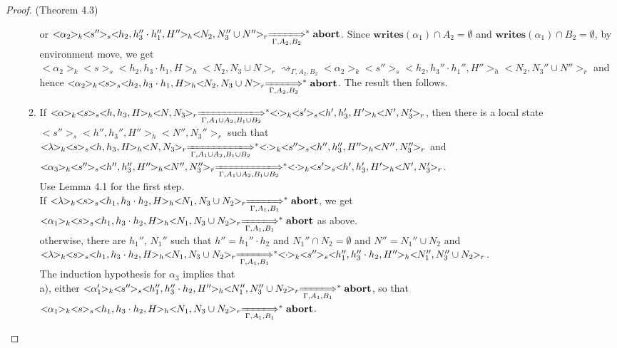 \documentclass{lmcs} %
\theoremstyle{plain}\newtheorem{satz}[thm]{Satz} %
\begin{document}
\begin{proof}{(Theorem 4.3)}
\begin{itemize}
\begin{enumerate}
            or $<\!\!\alpha_2\!\!>_k<\!\!s''\!\!>_s<\!\!h_2,h_3''\cdot h_1'',H''\!\!>_h<\!\!N_2,N_3''\cup N''\!\!>_r\xLongrightarrow[\Gamma, A_2,B_2]{}^*\mathbf{abort}$. Since $\mathbf{writes}(\alpha_1)\cap A_2 =\emptyset$ and $\mathbf{writes}(\alpha_1)\cap B_2 =\emptyset$, by environment move, we get $<\!\!\alpha_2\!\!>_k<\!\!s\!\!>_s<\!\!h_2,h_3\cdot h_1,H\!\!>_h<\!\!N_2,N_3\cup N\!\!>_r\rightsquigarrow_{\Gamma, A_2, B_2}<\!\!\alpha_2\!\!>_k<\!\!s''\!\!>_s<\!\!h_2,h_3''\cdot h_1'',H''\!\!>_h<\!\!N_2,N_3''\cup N''\!\!>_r$ and hence $<\!\!\alpha_2\!\!>_k<\!\!s\!\!>_s<\!\!h_2,h_3\cdot h_1,H\!\!>_h<\!\!N_2,N_3\cup N\!\!>_r\xLongrightarrow[\Gamma, A_2,B_2]{}^*\mathbf{abort}$. The result then follows.
      \item If $<\!\!\alpha\!\!>_k<\!\!s\!\!>_s<\!\!h,h_3,H\!\!>_h<\!\!N,N_3\!\!>_r\xLongrightarrow[\Gamma, A_1\cup A_2, B_1\cup B_2]{}^*<\!\!\cdot\!\!>_k<\!\!s'\!\!>_s<\!\!h',h_3',H'\!\!>_h<\!\!N',N_3'\!\!>_r$, then there is a local state $<\!\!s''\!\!>_s<\!\!h'',h_3'',H''\!\!>_h<\!\!N'',N_3''\!\!>_r$ such that $<\!\!\lambda\!\!>_k<\!\!s\!\!>_s<\!\!h,h_3,H\!\!>_h<\!\!N,N_3\!\!>_r\xLongrightarrow[\Gamma, A_1\cup A_2, B_1\cup B_2]{}^*<\!\!\cdot\!\!>_k<\!\!s''\!\!>_s<\!\!h'',h_3'',H''\!\!>_h<\!\!N'',N_3''\!\!>_r$ and $<\!\!\alpha_3\!\!>_k<\!\!s''\!\!>_s<\!\!h'',h_3'',H''\!\!>_h<\!\!N'',N_3''\!\!>_r\xLongrightarrow[\Gamma, A_1\cup A_2, B_1\cup B_2]{}^*<\!\!\cdot\!\!>_k<\!\!s'\!\!>_s<\!\!h',h_3',H'\!\!>_h<\!\!N',N_3'\!\!>_r$.\\
          Use Lemma 4.1 for the first step. \\
          If $<\!\!\lambda\!\!>_k<\!\!s\!\!>_s<\!\!h_1,h_3\cdot h_2,H\!\!>_h<\!\!N_1,N_3\cup N_2\!\!>_r\xLongrightarrow[\Gamma, A_1,B_1]{}^*\mathbf{abort}$, we get $<\!\!\alpha_1\!\!>_k<\!\!s\!\!>_s<\!\!h_1,h_3\cdot h_2,H\!\!>_h<\!\!N_1,N_3\cup N_2\!\!>_r\xLongrightarrow[\Gamma, A_1,B_1]{}^*\mathbf{abort}$ as above.\\
          otherwise, there are $h_1''$, $N_1''$ such that $h''=h_1''\cdot h_2$ and $N_1''\cap N_2=\emptyset$ and $N''=N_1''\cup N_2$ and $<\!\!\lambda\!\!>_k<\!\!s\!\!>_s<\!\!h_1,h_3\cdot h_2,H\!\!>_h<\!\!N_1,N_3\cup N_2\!\!>_r\xLongrightarrow[\Gamma, A_1, B_1]{}^*<\!\!\cdot\!\!>_k<\!\!s''\!\!>_s<\!\!h_1'',h_3''\cdot h_2,H''\!\!>_h<\!\!N_1'',N_3''\cup N_2\!\!>_r$.\\
          The induction hypothesis for $\alpha_3$ implies that\\
          a), either $<\!\!\alpha_1'\!\!>_k<\!\!s''\!\!>_s<\!\!h_1'',h_3''\cdot h_2,H''\!\!>_h<\!\!N_1'',N_3''\cup N_2\!\!>_r\xLongrightarrow[\Gamma, A_1, B_1]{}^*\mathbf{abort}$, so that $<\!\!\alpha_1\!\!>_k<\!\!s\!\!>_s<\!\!h_1,h_3\cdot h_2,H\!\!>_h<\!\!N_1,N_3\cup N_2\!\!>_r\xLongrightarrow[\Gamma, A_1, B_1]{}^*\mathbf{abort}$.\\

\end{enumerate}
\end{itemize}
\end{proof}
\end{document}
